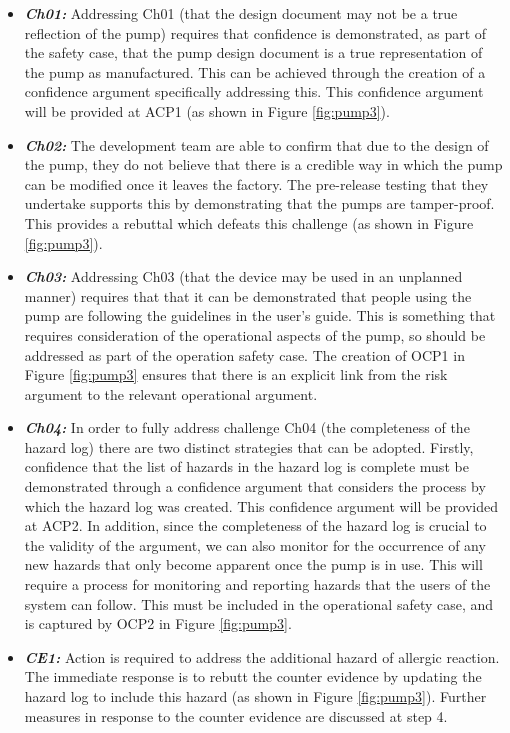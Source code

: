 \begin{itemize}
    \item \textbf{\textit{Ch01:}} Addressing Ch01 (that the design document may not be a true reflection of the pump) requires that confidence is demonstrated, as part of the safety case, that the pump design document is a true representation of the pump as manufactured. This can be achieved through the creation of a confidence argument specifically addressing this. This confidence argument will be provided at ACP1 (as shown in Figure \ref{fig:pump3}).
    \item \textbf{\textit{Ch02:}} The development team are able to confirm that due to the design of the pump, they do not believe that there is a credible way in which the pump can be modified once it leaves the factory. The pre-release testing that they undertake supports this by demonstrating that the pumps are tamper-proof. This provides a rebuttal which defeats this challenge (as shown in Figure \ref{fig:pump3}).
    \item \textbf{\textit{Ch03:}} Addressing Ch03 (that the device may be used in an unplanned manner) requires that that it can be demonstrated that people using the pump are following the guidelines in the user's guide. This is something that requires consideration of the operational aspects of the pump, so should be addressed as part of the operation safety case. The creation of OCP1 in Figure \ref{fig:pump3} ensures that there is an explicit link from the risk argument to the relevant operational argument.
    \item \textbf{\textit{Ch04:}} In order to fully address challenge Ch04 (the completeness of the hazard log) there are two distinct strategies that can be adopted. Firstly, confidence that the list of hazards in the hazard log is complete must be demonstrated through a confidence argument that considers the process by which the hazard log was created. This confidence argument will be provided at ACP2. In addition, since the completeness of the hazard log is crucial to the validity of the argument, we can also monitor for the occurrence of any new hazards that only become apparent once the pump is in use. This will require a process for monitoring and reporting hazards that the users of the system can follow. This must be included in the operational safety case, and is captured by OCP2 in Figure \ref{fig:pump3}.
    \item \textbf{\textit{CE1:}} Action is required to address the additional hazard of allergic reaction. The immediate response is to rebutt the counter evidence by updating the hazard log to include this hazard (as shown in Figure \ref{fig:pump3}). Further measures in response to the counter evidence are discussed at step 4.
\end{itemize}


